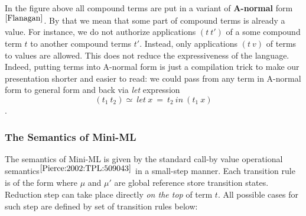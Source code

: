 \documentclass[a4paper,11pt,oneside]{article}
\theoremstyle{plain}
\begin{document}
	In the figure above all compound terms are put in a variant of \textbf{A-normal} form$^{\cite{Flanagan}}$. 
	By that we mean that some part of compound terms is already a value. 
	For instance, we do not authorize applications $(t~t')$ of a some compound term $t$ to another compound terms $t'$.
	Instead, only applications $(t~v)$ of terms to values are allowed. 
	 This does not reduce the expressiveness of the language. 
	 Indeed, putting terms into A-normal form is just a compilation trick to make our presentation shorter and easier to read: 
	 we could pass from any term in A-normal form to general form and back via \textit{let} expression 
	 $$(t_1~t_2) \simeq~let~x~=~t_2~in~(t_1~x)$$.
	
	
\subsubsection*{The Semantics of Mini-ML }
	The semantics of Mini-ML is given by the standard call-by value operational semantics{\footnotesize$^{ \cite[p.~54]{Pierce:2002:TPL:509043}}$} in a small-step manner.  
	Each transition rule is of the form  where $\mu$ and $\mu'$ are global reference store transition states. 
	Reduction step can take place directly \textit{on the top} of term $t$. All possible cases for such step are defined by set of transition rules below:
\end{document}
